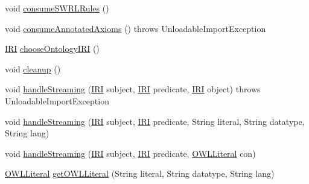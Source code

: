\begin{DoxyCompactItemize}
\item 
void \hyperlink{classorg_1_1coode_1_1owlapi_1_1rdfxml_1_1parser_1_1_o_w_l_r_d_f_consumer_af3e76891a9ccbe43c334b93f87d8efe7}{consume\-S\-W\-R\-L\-Rules} ()
\item 
void \hyperlink{classorg_1_1coode_1_1owlapi_1_1rdfxml_1_1parser_1_1_o_w_l_r_d_f_consumer_a0109fe49c4c2dcf31545efb7669bc2ad}{consume\-Annotated\-Axioms} ()  throws Unloadable\-Import\-Exception 
\item 
\hyperlink{classorg_1_1semanticweb_1_1owlapi_1_1model_1_1_i_r_i}{I\-R\-I} \hyperlink{classorg_1_1coode_1_1owlapi_1_1rdfxml_1_1parser_1_1_o_w_l_r_d_f_consumer_af32d66ea28f813200687fdd4c378d65e}{choose\-Ontology\-I\-R\-I} ()
\item 
void \hyperlink{classorg_1_1coode_1_1owlapi_1_1rdfxml_1_1parser_1_1_o_w_l_r_d_f_consumer_a58631bcb7c1598d1bd0a94c47c2ff6be}{cleanup} ()
\item 
void \hyperlink{classorg_1_1coode_1_1owlapi_1_1rdfxml_1_1parser_1_1_o_w_l_r_d_f_consumer_ae3f3d32254cc390e46b618a51514ef05}{handle\-Streaming} (\hyperlink{classorg_1_1semanticweb_1_1owlapi_1_1model_1_1_i_r_i}{I\-R\-I} subject, \hyperlink{classorg_1_1semanticweb_1_1owlapi_1_1model_1_1_i_r_i}{I\-R\-I} predicate, \hyperlink{classorg_1_1semanticweb_1_1owlapi_1_1model_1_1_i_r_i}{I\-R\-I} object)  throws Unloadable\-Import\-Exception 
\item 
void \hyperlink{classorg_1_1coode_1_1owlapi_1_1rdfxml_1_1parser_1_1_o_w_l_r_d_f_consumer_aee6c7a1b781f51e0f1e25f38b2f909c0}{handle\-Streaming} (\hyperlink{classorg_1_1semanticweb_1_1owlapi_1_1model_1_1_i_r_i}{I\-R\-I} subject, \hyperlink{classorg_1_1semanticweb_1_1owlapi_1_1model_1_1_i_r_i}{I\-R\-I} predicate, String literal, String datatype, String lang)
\item 
void \hyperlink{classorg_1_1coode_1_1owlapi_1_1rdfxml_1_1parser_1_1_o_w_l_r_d_f_consumer_aedc8338c2ec67ae1f3cb4b1d1bb40ffa}{handle\-Streaming} (\hyperlink{classorg_1_1semanticweb_1_1owlapi_1_1model_1_1_i_r_i}{I\-R\-I} subject, \hyperlink{classorg_1_1semanticweb_1_1owlapi_1_1model_1_1_i_r_i}{I\-R\-I} predicate, \hyperlink{interfaceorg_1_1semanticweb_1_1owlapi_1_1model_1_1_o_w_l_literal}{O\-W\-L\-Literal} con)
\item 
\hyperlink{interfaceorg_1_1semanticweb_1_1owlapi_1_1model_1_1_o_w_l_literal}{O\-W\-L\-Literal} \hyperlink{classorg_1_1coode_1_1owlapi_1_1rdfxml_1_1parser_1_1_o_w_l_r_d_f_consumer_a0562ca711c521e3bf42d834b392b3a52}{get\-O\-W\-L\-Literal} (String literal, String datatype, String lang)
\item 

\end{DoxyCompactItemize}

